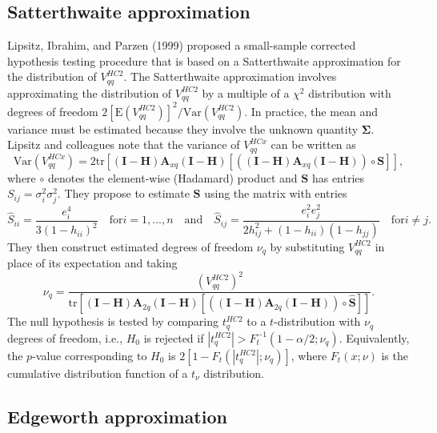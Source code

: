 \documentclass{article}\usepackage[]{graphicx}\usepackage[]{color}
\newcommand{\E}{\text{E}}
\newcommand{\Var}{\text{Var}}
\newcommand{\tr}{\text{tr}}
\newcommand{\bm}{\mathbf}
\newcommand{\bs}{\boldsymbol}
\begin{document}
\subsection{Satterthwaite approximation}

Lipsitz, Ibrahim, and Parzen (1999) proposed a small-sample corrected hypothesis testing procedure that is based on a Satterthwaite approximation for the distribution of $V^{HC2}_{qq}$. The Satterthwaite approximation involves approximating the distribution of $V^{HC2}_{qq}$ by a multiple of a $\chi^2$ distribution with degrees of freedom $2 \left[\E\left(V^{HC2}_{qq}\right)\right]^2 / \Var\left(V^{HC2}_{qq}\right)$. In practice, the mean and variance must be estimated because they involve the unknown quantity $\bs\Sigma$. Lipsitz and colleagues note that the variance of $V^{HCx}_{qq}$ can be written as \[
\Var\left(V^{HCx}_{qq}\right) = 2\tr\left[\left(\bm{I} - \bm{H}\right)\bm{A}_{xq} \left(\bm{I} - \bm{H}\right)\left[\left(\left(\bm{I} - \bm{H}\right)\bm{A}_{xq} \left(\bm{I} - \bm{H}\right)\right)\circ \bm{S}\right]\right], \]
where $\circ$ denotes the element-wise (Hadamard) product and $\bm{S}$ has entries $S_{ij} = \sigma_i^2 \sigma_j^2$. They propose to estimate $\bm{S}$ using the matrix with entries \[
\hat{S}_{ii} = \frac{e_i^4}{3(1 - h_{ii})^2} \quad \text{for} i = 1,...,n \quad \text{and} \quad \hat{S}_{ij} = \frac{e_i^2 e_j^2}{2 h_{ij}^2 + (1 - h_{ii})(1 - h_{jj})} \quad \text{for} i \neq j. \]
They then construct estimated degrees of freedom $\nu_q$ by substituting $V^{HC2}_{qq}$ in place of its expectation and taking 
\begin{equation}
\label{eq:Satterthwaite}
\nu_q = \frac{\left(V^{HC2}_{qq}\right)^2}{\tr\left[\left(\bm{I} - \bm{H}\right)\bm{A}_{2q} \left(\bm{I} - \bm{H}\right)\left[\left(\left(\bm{I} - \bm{H}\right)\bm{A}_{2q} \left(\bm{I} - \bm{H}\right)\right)\circ \bm{\hat{S}}\right]\right]}.
\end{equation}
The null hypothesis is tested by comparing $t^{HC2}_q$ to a $t$-distribution with $\nu_q$ degrees of freedom, i.e., $H_0$ is rejected if $|t^{HC2}_q| > F_t^{-1}(1 - \alpha / 2; \nu_q)$. Equivalently, the $p$-value corresponding to $H_0$ is $2 \left[1 - F_t\left(|t_q^{HC2}|; \nu_q\right)\right]$, where $F_t(x; \nu)$ is the cumulative distribution function of a $t_\nu$ distribution.

\subsection{Edgeworth approximation}
\end{document}
